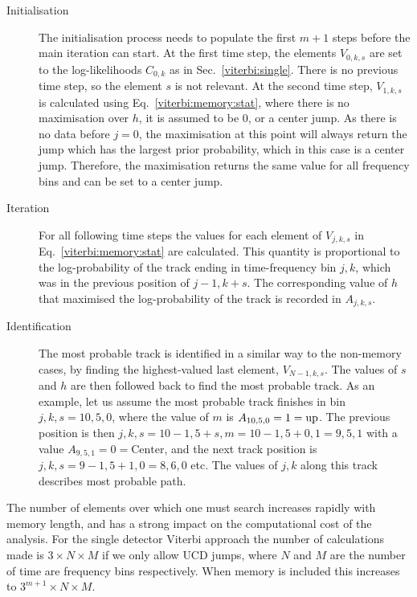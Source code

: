 \begin{description}
\item [Initialisation] The initialisation process needs to populate the first $m+1$ steps before the main iteration can start. At the first time step, the elements $V_{0,k,s}$ are set to the log-likelihoods $C_{0,k}$ as in Sec.~\ref{viterbi:single}.  There is no previous time step, so the element $s$ is not relevant. At the second time step, $V_{1,k,s}$ is calculated using Eq.~\ref{viterbi:memory:stat}, where there is no maximisation over $h$, it is assumed to be $0$, or a center jump. As there is no data before $j=0$, the maximisation at this point will always return the jump which has the largest prior probability, which in this case is a center jump. Therefore, the maximisation returns the same value for all frequency bins and can be set to a center jump.

\item [Iteration] For all following time steps the values for each element of $V_{j,k,s}$ in Eq.~\ref{viterbi:memory:stat} are calculated. This quantity is proportional to the log-probability of the track ending in time-frequency bin $j,k$, which was in the previous position of $j-1,k+s$. The corresponding value of $h$ that maximised the log-probability of the track is recorded in $A_{j,k,s}$.

\item [Identification] The most probable track is identified in a similar way to the non-memory cases, by finding the highest-valued last element, $V_{N-1,k,s}$. The values of $s$ and $h$ are then followed back to find the most probable track. As an example, let us assume the most probable track finishes in bin $j,k,s = 10,5,0$, where the value of $m$ is $A_{10,5,0} = 1 = \rm{up}$. The previous position is then $j,k,s=10-1,5+s,m =10-1,5+0,1=9,5,1$ with a value $A_{9,5,1} = 0 = \text{Center}$, and the next track position is $j,k,s=9-1,5+1,0=8,6,0$ etc. The values of $j,k$ along this track describes most probable path.
%
\end{description}

The number of elements over which one must search increases rapidly with memory length, and has a strong impact on the computational cost of the analysis. For the single detector Viterbi approach the number of calculations made is $3 \times N \times M$ if we only allow \ac{UCD} jumps, where $N$ and $M$ are the number of time are frequency bins respectively. When memory is included this increases to $3^{m+1} \times N \times M $.

